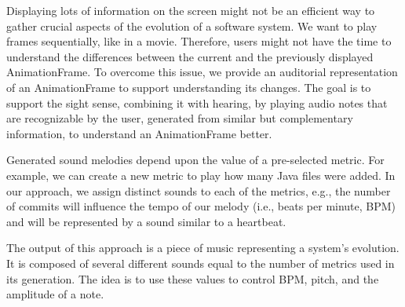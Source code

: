 \documentclass[11pt,twoside,english,singlespacing,headsepline,consistentlayout]{auxiliary/si-msc-thesis}
\begin{document}
Displaying lots of information on the screen might not be an efficient way to gather crucial aspects of the evolution of a software system. We want to play frames sequentially, like in a movie. Therefore, users might not have the time to understand the differences between the current and the previously displayed AnimationFrame. To overcome this issue, we provide an auditorial representation of an AnimationFrame to support understanding its changes. The goal is to support the sight sense, combining it with hearing, by playing audio notes that are recognizable by the user, generated from similar but complementary information, to understand an AnimationFrame better. 

Generated sound melodies depend upon the value of a pre-selected metric. For example, we can create a new metric to play how many Java files were added. In our approach, we assign distinct sounds to each of the metrics, e.g., the number of commits will influence the tempo of our melody (i.e., beats per minute, BPM) and will be represented by a sound similar to a heartbeat.

The output of this approach is a piece of music representing a system's evolution. It is composed of several different sounds equal to the number of metrics used in its generation. The idea is to use these values to control BPM, pitch, and the amplitude of a note. 
\end{document}
